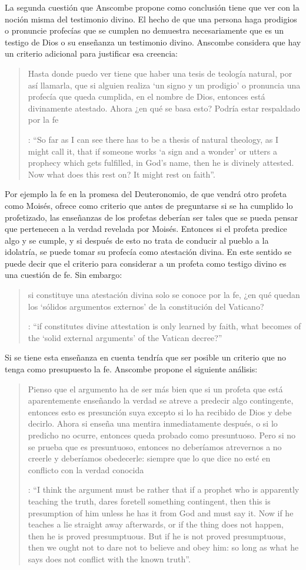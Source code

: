 La segunda cuestión que Anscombe propone como conclusión tiene que ver con la noción misma del testimonio divino. El hecho de que una persona haga prodigios o pronuncie profecías que se cumplen no demuestra necesariamente que es un testigo de Dios o su enseñanza un testimonio divino. Anscombe considera que hay un criterio adicional para justificar esa creencia: \blockquote[{\Cite[38]{anscombe2008faith:prophandmi}}: \enquote{So far as I can see there has to be a thesis of natural theology, as I might call it, that if someone works `a sign and a wonder' or utters a prophecy which gets fulfilled, in God's name, then he is divinely attested. Now what does this rest on? It might rest on faith}.]{Hasta donde puedo ver tiene que haber una tesis de teología natural, por así llamarla, que si alguien realiza `un signo y un prodigio' o pronuncia una profecía que queda cumplida, en el nombre de Dios, entonces está divinamente atestado. Ahora ¿en qué se basa esto? Podría estar respaldado por la fe}. Por ejemplo la fe en la promesa del Deuteronomio, de que vendrá otro profeta como Moisés, ofrece como criterio que antes de preguntarse si se ha cumplido lo profetizado, las enseñanzas de los profetas deberían ser tales que se pueda pensar que pertenecen a la verdad revelada por Moisés. Entonces si el profeta predice algo y se cumple, y si después de esto no trata de conducir al pueblo a la idolatría, se puede tomar su profecía como atestación divina. En este sentido se puede decir que el criterio para considerar a un profeta como testigo divino es una cuestión de fe. Sin embargo: \blockquote[{\Cite[38]{anscombe2008faith:prophandmi}}: \enquote{if  constitutes divine attestation is only learned by faith, what becomes of the `solid external arguments' of the Vatican decree?}]{si  constituye una atestación divina solo se conoce por la fe, ¿en qué quedan los `sólidos argumentos externos' de la constitución del Vaticano?}. Si se tiene esta enseñanza en cuenta tendría que ser posible un criterio que no tenga como presupuesto la fe. Anscombe propone el siguiente análisis: \blockquote[{\Cite[38]{anscombe2008faith:prophandmi}}: \enquote{I think the argument must be rather that if a prophet who is apparently teaching the truth, dares foretell something contingent, then this is presumption of him unless he has it from God and must say it. Now if he teaches a lie straight away afterwards, or if the thing does not happen, then he is proved presumptuous. But if he is not proved presumptuous, then we ought not to dare not to believe and obey him: so long as what he says does not conflict with the known truth}.]{Pienso que el argumento ha de ser más bien que si un profeta que está aparentemente enseñando la verdad se atreve a predecir algo contingente, entonces esto es presunción suya excepto si lo ha recibido de Dios y debe decirlo. Ahora si enseña una mentira inmediatamente después, o si lo predicho no ocurre, entonces queda probado como presuntuoso. Pero si no se prueba que es presuntuoso, entonces no deberíamos atrevernos a no creerle y deberíamos obedecerle: siempre que lo que dice no esté en conflicto con la verdad conocida}.\label{subsec:argprof}

